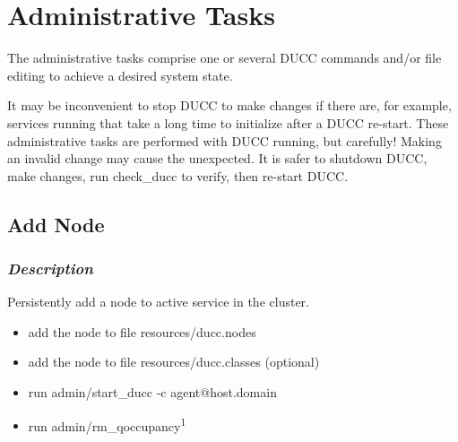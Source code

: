% 
% 
% 
% 

\section{Administrative Tasks}

   The administrative tasks comprise one or several DUCC commands 
   and/or file editing to achieve a desired system state.
   
   It may be inconvenient to stop DUCC to make changes if there are,
   for example, services running that take a long time to initialize
   after a DUCC re-start.  These administrative tasks are performed
   with DUCC running, but carefully!  Making an invalid change may 
   cause the unexpected.  It is safer to shutdown DUCC, make changes,
   run check\_ducc to verify, then re-start DUCC.

\subsection{Add Node}
\label{subsec:admin.add-node}

	\subsubsection{{\em Description}}
    Persistently add a node to active service in the cluster.
    \begin{itemize}
      \item add the node to file resources/ducc.nodes
      \item add the node to file resources/ducc.classes (optional)
      \item run admin/start\_ducc -c agent@host.domain
      \item run admin/rm\_qoccupancy\textsuperscript{1}
    \end{itemize}

